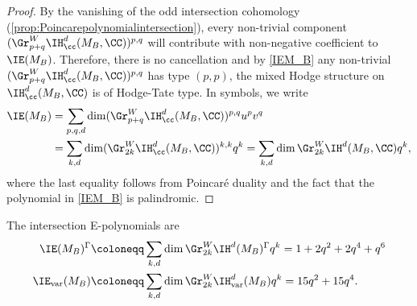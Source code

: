 \begin{proof}
By the vanishing of the odd intersection cohomology (\cf \cref{prop:Poincarepolynomialintersection}), every non-trivial component $(\Gr^W_{p+q} \IH^d_{\cc}(M_B, \CC))^{p,q}$ will contribute with non-negative coef\-ficient to $\IE(M_B)$. Therefore, there is no cancellation and by \eqref{IEM_B} any non-trivial $(\Gr^W_{p+q} \IH^d_{\cc}(M_B, \CC))^{p,q}$ has type $(p,p)$, \ie the mixed Hodge structure on $\IH^d_{\cc}(M_B, \CC)$ is of Hodge-Tate type.
In symbols, we write
\begin{align*}
\IE(M_B) & = \sum_{p,q, d} \dim ( \Gr^W_{p+q} \IH^d_{\cc}(M_B, \CC))^{p,q} u^pv^q\\
& = \sum_{k, d} \dim (\Gr^W_{2k} \IH^d_{\cc}(M_B, \CC))^{k,k} q^k = \sum_{k, d} \dim \Gr^W_{2k} \IH^d(M_B, \CC) q^k,
\end{align*}
where the last equality follows from Poincaré duality and the fact that the polynomial in \eqref{IEM_B} is palindromic.
\end{proof}

\begin{prop}\label{prop:Epolynomialinvvar}
The intersection E-polynomials are
\begin{align*}
\IE(M_B)^{\Gamma} & \coloneqq \sum_{k, d} \dim \Gr^W_{2k}\IH^d(M_B)^{\Gamma} q^k = 1+2q^2+2q^4+q^6\\
\IE_{\mathrm{var}}(M_B) & \coloneqq \sum_{k, d} \dim \Gr^W_{2k}\IH^d_{\mathrm{var}}(M_B)q^k = 15q^2+15q^4.
\end{align*}
\end{prop}

